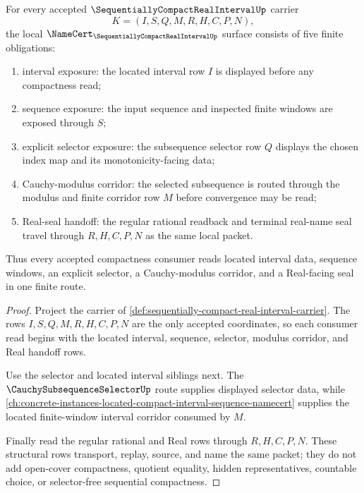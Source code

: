 \begin{theorem}
\label{thm:sequentially-compact-real-interval-obligation}
For every accepted $\SequentiallyCompactRealIntervalUp$ carrier
$$
K=(I,S,Q,M,R,H,C,P,N),
$$
the local $\NameCert_{\SequentiallyCompactRealIntervalUp}$ surface consists of five finite obligations:
\begin{enumerate}
\item interval exposure: the located interval row $I$ is displayed before any compactness read;
\item sequence exposure: the input sequence and inspected finite windows are exposed through $S$;
\item explicit selector exposure: the subsequence selector row $Q$ displays the chosen index map and its monotonicity-facing data;
\item Cauchy-modulus corridor: the selected subsequence is routed through the modulus and finite corridor row $M$ before convergence may be read;
\item Real-seal handoff: the regular rational readback and terminal real-name seal travel through $R,H,C,P,N$ as the same local packet.
\end{enumerate}
Thus every accepted compactness consumer reads located interval data, sequence windows, an explicit selector, a Cauchy-modulus corridor, and a Real-facing seal in one finite route.
\end{theorem}
\begin{proof}
Project the carrier of \autoref{def:sequentially-compact-real-interval-carrier}. The rows $I,S,Q,M,R,H,C,P,N$ are the only accepted coordinates, so each consumer read begins with the located interval, sequence, selector, modulus corridor, and Real handoff rows.

Use the selector and located interval siblings next. The $\CauchySubsequenceSelectorUp$ route supplies displayed selector data, while \autoref{ch:concrete-instances-located-compact-interval-sequence-namecert} supplies the located finite-window interval corridor consumed by $M$.

Finally read the regular rational and Real rows through $R,H,C,P,N$. These structural rows transport, replay, source, and name the same packet; they do not add open-cover compactness, quotient equality, hidden representatives, countable choice, or selector-free sequential compactness.
\end{proof}


